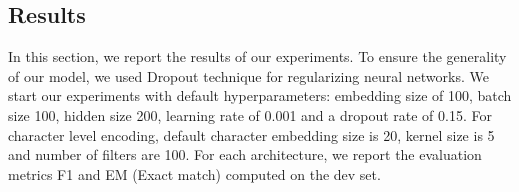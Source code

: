 \documentclass{article} %
\begin{document}
%

\subsection{Results}
In this section, we report the results of our experiments. To ensure the generality of our model, we used Dropout technique for regularizing neural networks. We start our experiments with default hyperparameters: embedding size of 100, batch size 100, hidden size 200, learning rate of 0.001 and a dropout rate of 0.15. For character level encoding, default character embedding size is 20, kernel size is 5 and number of filters are 100. For each architecture, we report the evaluation metrics F1 and EM (Exact match) computed on the dev set. 
\end{document}
